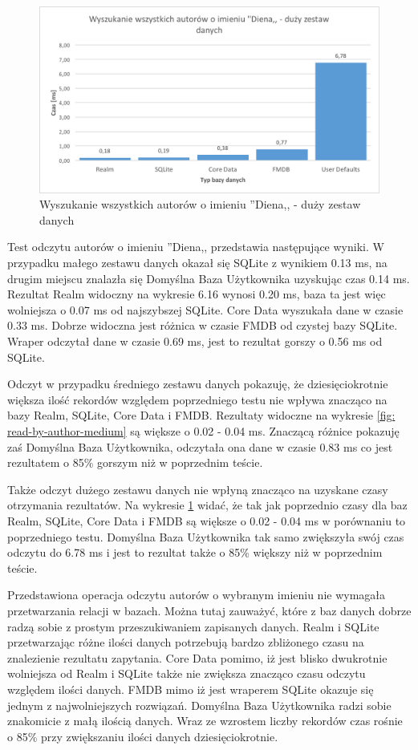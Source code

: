 \begin{figure}[H]
\centering
	\includegraphics[width=15cm]{img/read_data/read_by_authors/read_by_author_big_test.png}
	\caption{Wyszukanie wszystkich autorów o imieniu ''Diena,, - duży zestaw danych}
	\label{fig: read-by-author-big}
\end{figure}

Test odczytu autorów o imieniu ''Diena,, przedstawia następujące wyniki. W przypadku małego zestawu danych okazał się SQLite z wynikiem 0.13 ms, na drugim miejscu znalazła się Domyślna Baza Użytkownika uzyskując czas 0.14 ms. Rezultat Realm widoczny na wykresie 6.16 wynosi 0.20 ms, baza ta jest więc wolniejsza o 0.07 ms od najszybszej SQLite. Core Data wyszukała dane w czasie 0.33 ms. Dobrze widoczna jest różnica w czasie FMDB od czystej bazy SQLite. Wraper odczytał dane w czasie 0.69 ms, jest to rezultat gorszy o 0.56 ms od SQLite. 

Odczyt w przypadku średniego zestawu danych pokazuję, że dziesięciokrotnie większa ilość rekordów względem poprzedniego testu  nie wpływa znacząco na bazy Realm, SQLite, Core Data i FMDB. Rezultaty widoczne na wykresie \ref{fig: read-by-author-medium} są większe o 0.02 - 0.04 ms. Znaczącą różnice pokazuję zaś Domyślna Baza Użytkownika, odczytała ona dane w czasie 0.83 ms co jest rezultatem o 85\% gorszym niż w poprzednim teście. 

Także odczyt dużego zestawu danych nie wpłyną znacząco na uzyskane czasy otrzymania rezultatów. Na wykresie \ref{fig: read-by-author-big} widać, że tak jak poprzednio czasy dla baz Realm, SQLite, Core Data i FMDB są większe o 0.02 - 0.04 ms w porównaniu to poprzedniego testu. Domyślna Baza Użytkownika tak samo zwiększyła swój czas odczytu do 6.78 ms i jest to rezultat także o 85\% większy niż w poprzednim teście. 

Przedstawiona operacja odczytu autorów o wybranym imieniu nie wymagała przetwarzania relacji w bazach. Można tutaj zauważyć, które z baz danych dobrze radzą sobie z prostym przeszukiwaniem zapisanych danych. Realm i SQLite przetwarzając różne ilości danych potrzebują bardzo zbliżonego czasu na znalezienie rezultatu zapytania. Core Data pomimo, iż jest blisko dwukrotnie wolniejsza od Realm  i SQLite także nie zwiększa znacząco czasu odczytu względem ilości danych. FMDB mimo iż jest wraperem SQLite okazuje się jednym z najwolniejszych rozwiązań. Domyślna Baza Użytkownika radzi sobie znakomicie z małą ilością danych. Wraz ze wzrostem liczby rekordów czas rośnie o 85\% przy zwiększaniu ilości danych dziesięciokrotnie.

